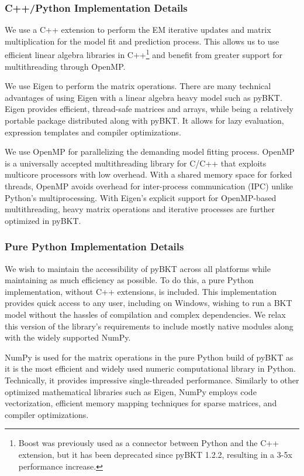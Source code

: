 \documentclass{edm_article}
\begin{document}
\subsubsection{C++/Python Implementation Details}
We use a C++ extension to perform the EM iterative updates and matrix multiplication for the model fit and prediction process. This allows us to use efficient linear algebra libraries in C++\footnote{Boost was previously used as a connector between Python and the C++ extension, but it has been deprecated since pyBKT 1.2.2, resulting in a 3-5x performance increase.} and benefit from greater support for multithreading through OpenMP. 

We use Eigen to perform the matrix operations. There are many technical advantages of using Eigen with a linear algebra heavy model such as pyBKT. Eigen provides efficient, thread-safe matrices and arrays, while being a relatively portable package distributed along with pyBKT. It allows for lazy evaluation, expression templates and compiler optimizations. 

We use OpenMP for parallelizing the demanding model fitting process. OpenMP is a universally accepted multithreading library for C/C++ that exploits multicore processors with low overhead. With a shared memory space for forked threads, OpenMP avoids overhead for inter-process communication (IPC) unlike Python's multiprocessing. With Eigen's explicit support for OpenMP-based multithreading, heavy matrix operations and iterative processes are further optimized in pyBKT.

\subsubsection{Pure Python Implementation Details}
We wish to maintain the accessibility of pyBKT across all platforms while maintaining as much efficiency as possible. To do this, a pure Python implementation, without C++ extensions, is included. This implementation provides quick access to any user, including on Windows, wishing to run a BKT model without the hassles of compilation and complex dependencies. We relax this version of the library's requirements to include mostly native modules along with the widely supported NumPy.

NumPy is used for the matrix operations in the pure Python build of pyBKT as it is the most efficient and widely used numeric computational library in Python. Technically, it provides impressive single-threaded performance. Similarly to other optimized mathematical libraries such as Eigen, NumPy employs code vectorization, efficient memory mapping techniques for sparse matrices, and compiler optimizations.
\end{document}
